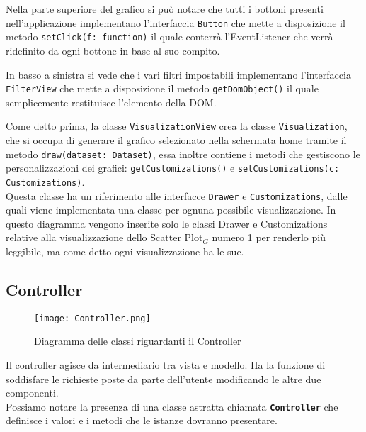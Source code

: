 Nella parte superiore del grafico si può notare che tutti i bottoni presenti nell'applicazione implementano l'interfaccia \texttt{Button} che mette a disposizione il metodo \texttt{setClick(f: function)} il quale conterrà l'EventListener che verrà ridefinito da ogni bottone in base al suo compito.

In basso a sinistra si vede che i vari filtri impostabili implementano l'interfaccia \texttt{FilterView} che mette a disposizione il metodo \texttt{getDomObject()} il quale semplicemente restituisce l'elemento della DOM.

Come detto prima, la classe \texttt{VisualizationView} crea la classe \texttt{Visualization}, che si occupa di generare il grafico selezionato nella schermata home tramite il metodo \texttt{draw(dataset: Dataset)}, essa inoltre contiene i metodi che gestiscono le personalizzazioni dei grafici: \texttt{getCustomizations()} e \texttt{setCustomizations(c: Customizations)}. \\Questa classe ha un riferimento alle interfacce \texttt{Drawer} e \texttt{Customizations}, dalle quali viene implementata una classe per ognuna possibile visualizzazione. In questo diagramma vengono inserite solo le classi Drawer e Customizations relative alla visualizzazione dello Scatter Plot$_G$ numero 1 per renderlo più leggibile, ma come detto ogni visualizzazione ha le sue.

\subsection{Controller}
\begin{figure}[ht]
	\centering
	\texttt{[image: Controller.png]}
	\caption{Diagramma delle classi riguardanti il Controller}
  \end{figure}
\label{controller}Il controller agisce da intermediario tra vista e modello. Ha la funzione di soddisfare le richieste poste da parte dell'utente modificando le altre due componenti.\\
Possiamo notare la presenza di una classe astratta chiamata \textbf{\texttt{Controller}} che definisce i valori e i metodi che le istanze dovranno presentare.

